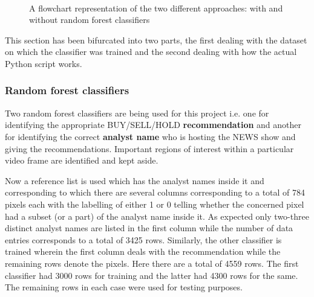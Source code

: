 \begin{figure}[h]
 \centering
  \\
 \vspace{1.5cm}
 \caption{A flowchart representation of the two different approaches: with and without random forest classifiers}
 \label{fig:not_rf_and_rf}
\end{figure}

This section has been bifurcated into two parts, the first dealing with the dataset on which the classifier was trained and the second dealing with how the actual Python script works.

\subsubsection{Random forest classifiers}
Two random forest classifiers are being used for this project i.e. one for identifying the appropriate BUY/SELL/HOLD \textbf{recommendation} and another for identifying the correct \textbf{analyst name} who is hosting the NEWS show and giving the recommendations. Important regions of interest within a particular video frame are identified and kept aside. \par

Now a reference list is used which has the analyst names inside it and corresponding to which there are several columns corresponding to a total of 784 pixels each with the labelling of either 1 or 0 telling whether the concerned pixel had a subset (or a part) of the analyst name inside it. As expected only two-three distinct analyst names are listed in the first column while the number of data entries corresponds to a total of 3425 rows. Similarly, the other classifier is trained wherein the first column deals with the recommendation while the remaining rows denote the pixels. Here there are a total of 4559 rows. The first classifier had 3000 rows for training and the latter had 4300 rows for the same. The remaining rows in each case were used for testing purposes. \par


